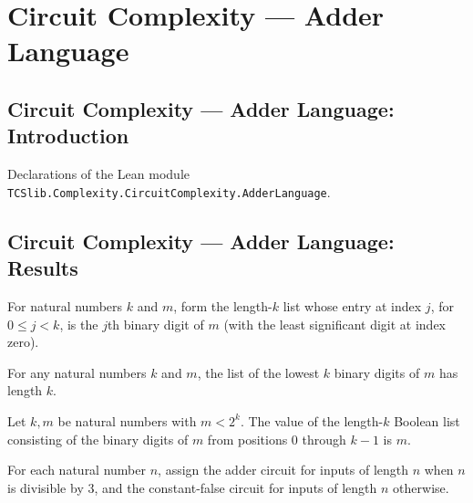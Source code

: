 \section{Circuit Complexity --- Adder Language}
\subsection*{Circuit Complexity --- Adder Language: Introduction}

Declarations of the Lean module \texttt{TCSlib.Complexity.CircuitComplexity.AdderLanguage}.

\subsection*{Circuit Complexity --- Adder Language: Results}

\begin{definition}
\label{BoolCircuit.natToBits}
\leanok
For natural numbers $k$ and $m$, form the length-$k$ list whose entry at index $j$, for
$0\le j<k$, is the $j$th binary digit of $m$ (with the least significant digit at index
zero).
\end{definition}

\begin{theorem}
\label{BoolCircuit.length_natToBits}
\leanok
{}
For any natural numbers $k$ and $m$, the list of the lowest $k$ binary digits of $m$ has
length $k$.
\end{theorem}

\begin{theorem}
\label{BoolCircuit.bitsVal_natToBits}
\leanok
{}
Let $k,m$ be natural numbers with $m<2^k$. The value of the length-$k$ Boolean list
consisting of the binary digits of $m$ from positions $0$ through $k-1$ is $m$.
\end{theorem}

\begin{definition}
\label{BoolCircuit.adderFamily}
\leanok
{}
For each natural number $n$, assign the adder circuit for inputs of length $n$ when $n$
is divisible by $3$, and the constant-false circuit for inputs of length $n$ otherwise.
\end{definition}

